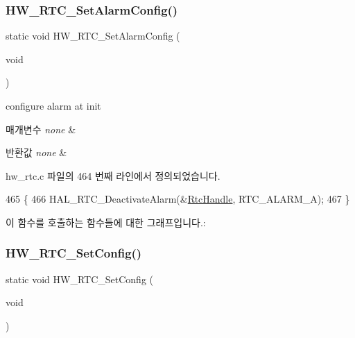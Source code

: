 \subsubsection{\texorpdfstring{H\+W\+\_\+\+R\+T\+C\+\_\+\+Set\+Alarm\+Config()}{HW\_RTC\_SetAlarmConfig()}}
{\footnotesize\ttfamily static void H\+W\+\_\+\+R\+T\+C\+\_\+\+Set\+Alarm\+Config (\begin{DoxyParamCaption}\item[{void}]{ }\end{DoxyParamCaption})\hspace{0.3cm}{\ttfamily [static]}}



configure alarm at init 


\begin{DoxyParams}{매개변수}
{\em none} & \\
\hline
\end{DoxyParams}

\begin{DoxyRetVals}{반환값}
{\em none} & \\
\hline
\end{DoxyRetVals}


hw\+\_\+rtc.\+c 파일의 464 번째 라인에서 정의되었습니다.


\begin{DoxyCode}
465 \{
466   HAL\_RTC\_DeactivateAlarm(&\mbox{\hyperlink{hw__rtc_8c_af5a469a44a56337e00dc30b13e2bc051}{RtcHandle}}, RTC\_ALARM\_A);
467 \}
\end{DoxyCode}
이 함수를 호출하는 함수들에 대한 그래프입니다.\+:
\mbox{\label{group___lory_s_d_k___r_t_c___functions_ga6eeed66a0970c9b0f48a7e2088b524f1}} 
\subsubsection{\texorpdfstring{H\+W\+\_\+\+R\+T\+C\+\_\+\+Set\+Config()}{HW\_RTC\_SetConfig()}}
{\footnotesize\ttfamily static void H\+W\+\_\+\+R\+T\+C\+\_\+\+Set\+Config (\begin{DoxyParamCaption}\item[{void}]{ }\end{DoxyParamCaption})\hspace{0.3cm}{\ttfamily [static]}}



